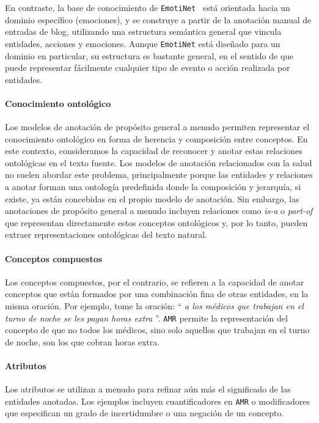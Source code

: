 En contraste, la base de conocimiento de \texttt{EmotiNet}~\cite{Balahur2011} está orientada hacia un dominio específico (emociones), y se construye a partir de la anotación manual de entradas de blog, utilizando una estructura semántica general que vincula entidades, acciones y emociones.
Aunque \texttt{EmotiNet} está diseñado para un dominio en particular, su estructura es bastante general, en el sentido de que puede representar fácilmente cualquier tipo de evento o acción realizada por entidades.

\paragraph{Conocimiento ontológico}

Los modelos de anotación de propósito general a menudo permiten representar el conocimiento ontológico en forma de herencia y composición entre conceptos. En este contexto, consideramos la capacidad de reconocer y anotar estas relaciones ontológicas en el texto fuente. Los modelos de anotación relacionados con la salud no suelen abordar este problema, principalmente porque las entidades y relaciones a anotar forman una ontología predefinida donde la composición y jerarquía, si existe, ya están concebidas en el propio modelo de anotación. Sin embargo, las anotaciones de propósito general a menudo incluyen relaciones como \textit{is-a} o \textit{part-of} que representan directamente estos conceptos ontológicos y, por lo tanto, pueden extraer representaciones ontológicas del texto natural.

\paragraph{Conceptos compuestos}

Los conceptos compuestos, por el contrario, se refieren a la capacidad de anotar conceptos que están formados por una combinación fina de otras entidades, en la misma oración. Por ejemplo, tome la oración: `` \textit{a los médicos que trabajan en el turno de noche se les pagan horas extra} ''. \texttt{AMR} permite la representación del concepto de que no todos los médicos, sino solo aquellos que trabajan en el turno de noche, son los que cobran horas extra.

\paragraph{Atributos}

Los atributos se utilizan a menudo para refinar aún más el significado de las entidades anotadas. Los ejemplos incluyen cuantificadores en \texttt{AMR} o modificadores que especifican un grado de incertidumbre o una negación de un concepto.

